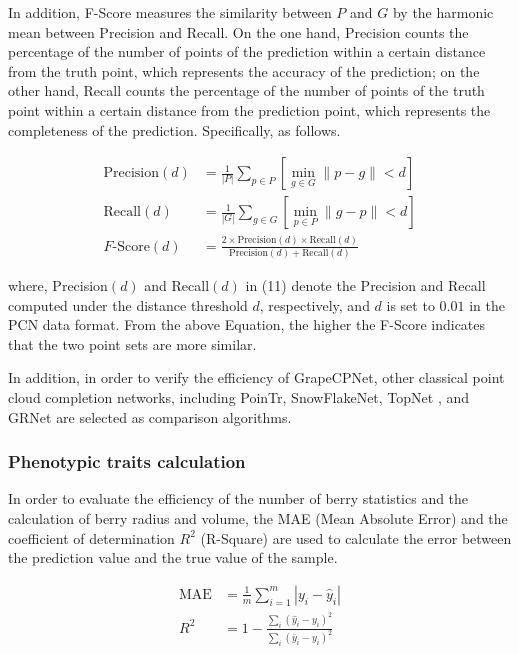 \documentclass[12pt]{article}
\begin{document}
In addition, F-Score measures the similarity between $P$ and $G$ by the harmonic mean between Precision and Recall. 
On the one hand, Precision counts the percentage of the number of points of the prediction within a certain distance from the truth point, which represents the accuracy of the prediction;
on the other hand, Recall counts the percentage of the number of points of the truth point within a certain distance from the prediction point, which represents the completeness of the prediction. Specifically, as follows.


\begin{align}
    \text{Precision}(d) &= \frac{1}{|P|} \sum_{p \in P} \left[ \min_{g \in G} \|p - g\| < d \right] \tag{9}\\
    \text{Recall}(d) &= \frac{1}{|G|} \sum_{g \in G} \left[ \min_{p \in P} \|g - p\| < d \right] \tag{10}\\
    F\text{-Score}(d) &= \frac{2 \times \text{Precision}(d) \times \text{Recall}(d)}{\text{Precision}(d) + \text{Recall}(d)} \tag{11}
\end{align}

{\raggedright where, Precision$(d)$ and Recall$(d)$ in (11) denote the Precision and Recall computed under the distance threshold $d$, respectively, and $d$ is set to $0.01$ in the PCN data format. 
From the above Equation, the higher the F-Score indicates that the two point sets are more similar.}

In addition, in order to verify the efficiency of GrapeCPNet, other classical point cloud completion networks, including PoinTr, SnowFlakeNet, TopNet \citep{tchapmi_topnet_2019}, and GRNet \citep{xie_grnet_2020} are selected as comparison algorithms. 

\subsubsection{Phenotypic traits calculation}
\label{sec:253}
In order to evaluate the efficiency of the number of berry statistics and the calculation of berry radius and volume, the MAE (Mean Absolute Error) and the coefficient of determination $R^2$ (R-Square) are used to calculate the error between the prediction value and the true value of the sample.

\begin{align}
    \text{MAE} &= \frac{1}{m} \sum_{i=1}^{m} |y_i - \hat{y}_i| \tag{12}\\
    R^2 &= 1 - \frac{\sum_{i} (\hat{y}_i - y_i)^2}{\sum_{i} (\bar{y}_i - y_i)^2} \tag{13}
\end{align}
\end{document}
